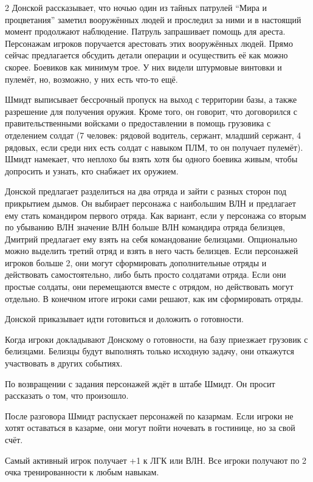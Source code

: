 \documentclass[twoside]{article}
\begin{document}
\begin{multicols}{2}
Донской рассказывает, что ночью один из тайных патрулей \enquote{Мира и
процветания} заметил вооружённых людей и проследил за ними и в настоящий
момент продолжают наблюдение. Патруль запрашивает помощь для ареста.
Персонажам игроков поручается арестовать этих вооружённых людей. Прямо
сейчас предлагается обсудить детали операции и осуществить её как можно
скорее. Боевиков как минимум трое. У них видели штурмовые винтовки и
пулемёт, но, возможно, у них есть что-то ещё.

Шмидт выписывает бессрочный пропуск на выход с территории базы, а также
разрешение для получения оружия. Кроме того, он говорит, что договорился
с правительственными войсками о предоставлении в помощь грузовика с
отделением солдат (7 человек: рядовой водитель, сержант, младший
сержант, 4 рядовых, если среди них есть солдат с навыком ПЛМ,
то он получает пулемёт). Шмидт намекает, что неплохо бы взять хотя бы
одного боевика живым, чтобы допросить и узнать, кто снабжает их оружием.

Донской предлагает разделиться на два отряда и зайти с разных сторон под
прикрытием дымов. Он выбирает персонажа с наибольшим ВЛН и предлагает
ему стать командиром первого отряда. Как вариант, если у персонажа со
вторым по убыванию ВЛН значение ВЛН больше ВЛН командира отряда
белизцев, Дмитрий предлагает ему взять на себя командование белизцами.
Опционально можно выделить третий отряд и взять в него часть белизцев.
Если персонажей игроков больше 2, они могут сформировать дополнительные
отряды и действовать самостоятельно, либо быть просто солдатами отряда.
Если они простые солдаты, они перемещаются вместе с отрядом, но
действовать могут отдельно. В конечном итоге игроки сами решают, как им
сформировать отряды.

Донской приказывает идти готовиться и доложить о готовности.

Когда игроки докладывают Донскому о готовности, на базу приезжает
грузовик с белизцами. Белизцы будут выполнять только исходную задачу,
они откажутся участвовать в других событиях.

По возвращении с задания персонажей ждёт в штабе Шмидт. Он просит
рассказать о том, что произошло.

После разговора Шмидт распускает персонажей по казармам. Если игроки не
хотят оставаться в казарме, они могут пойти ночевать в гостинице, но за
свой счёт.

Самый активный игрок получает +1 к ЛГК или ВЛН. Все игроки получают по 2 очка
тренированности к любым навыкам.


\end{multicols}
\end{document}
